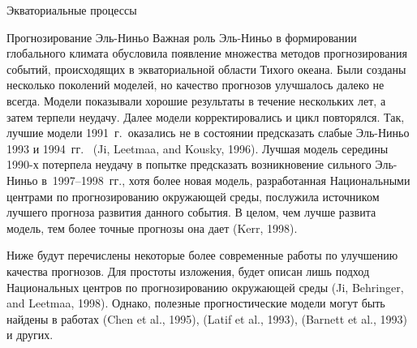 \begin{chapter}{Экваториальные процессы}
\begin{section}{Прогнозирование Эль-Ниньо}
%
Важная роль Эль-Ниньо в формировании глобального климата обусловила появление
множества методов прогнозирования событий, происходящих в экваториальной 
области Тихого океана. Были созданы несколько поколений моделей, но качество
прогнозов улучшалось далеко не всегда. Модели показывали хорошие результаты
в течение нескольких лет, а затем терпели неудачу. Далее модели 
корректировались и цикл повторялся. Так, лучшие модели 1991~г.\ оказались
не в состоянии предсказать слабые Эль-Ниньо 1993 и 1994~гг.\ %
(Ji, Leetmaa, and Kousky, 1996). Лучшая модель середины 1990-х потерпела
неудачу в попытке предсказать возникновение сильного Эль-Ниньо 
в~1997--1998~гг., хотя более новая модель, разработанная Национальными 
центрами по прогнозированию окружающей среды, послужила источником лучшего
прогноза развития данного события. В целом, чем лучше развита модель,
тем более точные прогнозы она дает (Kerr, 1998).
%

Ниже будут перечислены некоторые более современные работы по улучшению 
качества прогнозов. Для простоты изложения, будет описан лишь подход
Национальных центров по прогнозированию окружающей среды
(Ji, Behringer, and Leetmaa, 1998). Однако, полезные прогностические модели
могут быть найдены в работах (Chen et al., 1995), (Latif et al., 1993), 
(Barnett et al., 1993) и других.
%


\end{section}
\end{chapter}
